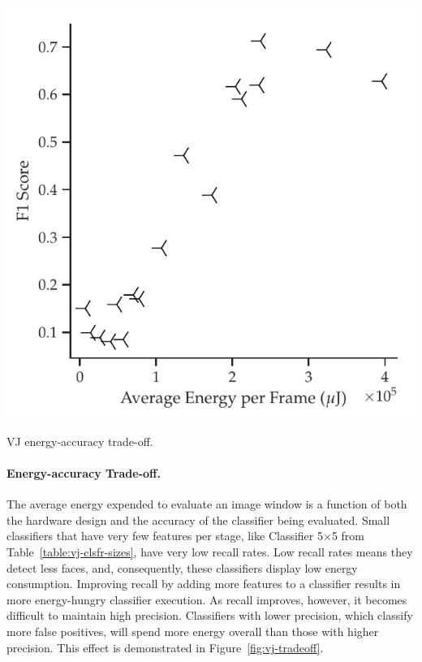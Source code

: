 \begin{marginfigure}
\includegraphics[width=\textwidth]{nsp-figs/eval_vj_energ_acc2.pdf}
    \caption{VJ energy-accuracy trade-off.}
    \label{fig:vj-tradeoff}
\end{marginfigure}

\paragraph{Energy-accuracy Trade-off.} The average energy expended to evaluate an image window
is a function of both the hardware design and the accuracy of the classifier being evaluated.
Small classifiers that have very few features per stage, like Classifier 5$\times$5 from
Table~\ref{table:vj-clsfr-sizes}, have very low recall rates. Low recall rates means they detect less
faces, and, consequently, these classifiers display low energy consumption. Improving recall by
adding more features to a classifier results in more energy-hungry classifier execution. As recall
improves, however, it becomes difficult to maintain high precision. Classifiers with lower precision,
which classify more false positives, will spend more energy overall than those with higher precision.
This effect is demonstrated in Figure~\ref{fig:vj-tradeoff}.


